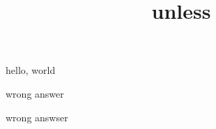\documentclass{amsart}
\title{unless}
\begin{document}
\maketitle

hello, world

\unless\iftrue
    wrong answer
\else
    right answer
\fi

\unless\iffalse
    right answer
\else
    wrong answser
\fi
\end{document}
